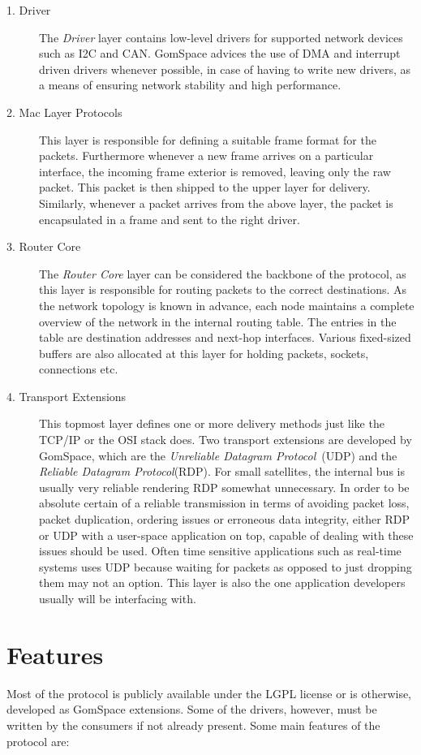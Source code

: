 \begin{description}
	\item[1. Driver] The \textit{Driver} layer contains low-level drivers for supported network devices such as I2C and CAN. GomSpace advices the use of DMA and interrupt driven drivers whenever possible, in case of having to write new drivers, as a means of ensuring network stability and high performance.
	\item[2. Mac Layer Protocols] This layer is responsible for defining a suitable frame format for the packets. Furthermore whenever a new frame arrives on a particular interface, the incoming frame exterior is removed, leaving only the raw packet. This packet is then shipped to the upper layer for delivery. Similarly, whenever a packet arrives from the above layer, the packet is encapsulated in a frame and sent to the right driver.
	\item[3. Router Core] The \textit{Router Core} layer can be considered the backbone of the protocol, as this layer is responsible for routing packets to the correct destinations. As the network topology is known in advance, each node maintains a complete overview of the network in the internal routing table. The entries in the table are destination addresses and next-hop interfaces. Various fixed-sized buffers are also allocated at this layer for holding packets, sockets, connections etc.
	\item[4. Transport Extensions] This topmost layer defines one or more delivery methods just like the TCP/IP or the OSI stack does. Two transport extensions are developed by GomSpace, which are the \textit{Unreliable Datagram Protocol}~(UDP) and the \textit{Reliable Datagram Protocol}(RDP). For small satellites, the internal bus is usually very reliable rendering RDP somewhat unnecessary. In order to be absolute certain of a reliable transmission in terms of avoiding packet loss, packet duplication, ordering issues or erroneous data integrity, either RDP or UDP with a user-space application on top, capable of dealing with these issues should be used. Often time sensitive applications such as real-time systems uses UDP because waiting for packets as opposed to just dropping them may not an option. This layer is also the one application developers usually will be interfacing with.

\end{description}
  
\section{Features}
Most of the protocol is publicly available under the LGPL license or is otherwise, developed as GomSpace extensions. Some of the drivers, however, must be written by the consumers if not already present. Some main features of the protocol are:

